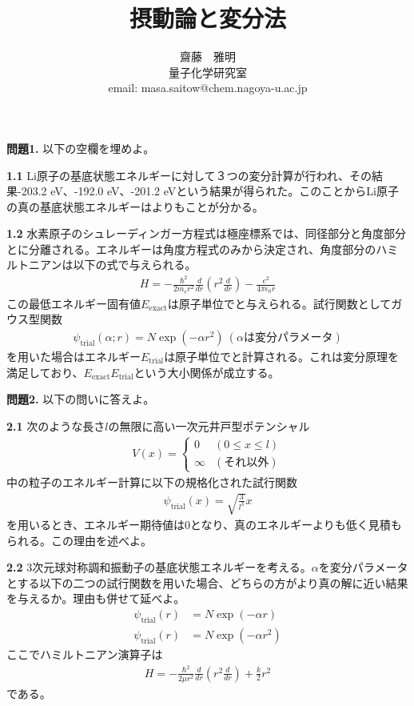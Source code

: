 \documentclass[11pt,pra,aps]{revtex4}
\newcommand{\boxz}[1]{\boxed{\phantom{\text{#1}}}}
\begin{document}
\title{摂動論と変分法}
\author{齋藤　雅明 \\ 量子化学研究室 \\ email: masa.saitow@chem.nagoya-u.ac.jp}

\maketitle

\noindent
{\bf 問題1.} 以下の空欄を埋めよ。

\noindent
{\bf 1.1} Li原子の基底状態エネルギーに対して３つの変分計算が行われ、その結果-203.2 eV、-192.0 eV、-201.2 eVという結果が得られた。このことからLi原子の真の基底状態エネルギーは\boxz{-203.2 eV}よりも\boxz{低い}ことが分かる。

\noindent
{\bf 1.2} 水素原子のシュレーディンガー方程式は極座標系では、同径部分と角度部分とに分離される。エネルギーは角度方程式のみから決定され、角度部分のハミルトニアンは以下の式で与えられる。
\begin{align}
  H = -\frac{\hbar^2}{2m_e r^2}\frac{d}{dr}\left(r^2\frac{d}{dr}\right)-\frac{e^2}{4\pi\epsilon_0 r}
\end{align}
この最低エネルギー固有値$E_\text{exact}$は原子単位で\boxz{-0.5}と与えられる。試行関数としてガウス型関数
\begin{align}
  \psi_\text{trial}(\alpha;r)=N\exp\left(-\alpha r^2\right) \ (\alpha\text{は変分パラメータ})
\end{align}
を用いた場合はエネルギー$E_\text{trial}$は原子単位で\boxz{-0.424}と計算される。これは変分原理を満足しており、$E_\text{exact}$\boxz{$\leq$}$E_\text{trial}$という大小関係が成立する。

\noindent
{\bf 問題2.} 以下の問いに答えよ。

\noindent
{\bf 2.1} 次のような長さ$l$の無限に高い一次元井戸型ポテンシャル
\begin{align}
  V(x)=\left\{
  \begin{array}{cc}
    0 & (0 \leq x \leq l) \\
    \infty & (\text{それ以外})
  \end{array}
  \right.
\end{align}
中の粒子のエネルギー計算に以下の規格化された試行関数
\begin{align}
  \psi_\text{trial}(x) = \sqrt{\frac{3}{l^3}}x
\end{align}
を用いるとき、エネルギー期待値は0となり、真のエネルギーよりも低く見積もられる。この理由を述べよ。

\noindent
{\bf 2.2} 3次元球対称調和振動子の基底状態エネルギーを考える。$\alpha$を変分パラメータとする以下の二つの試行関数を用いた場合、どちらの方がより真の解に近い結果を与えるか。理由も併せて延べよ。
\begin{align}
  \psi_\text{trial}(r)&=N\exp\left(-\alpha r\right) \\
  \psi_\text{trial}(r)&=N\exp\left(-\alpha r^2\right)
\end{align}
ここでハミルトニアン演算子は
\begin{align}
  H=-\frac{\hbar^2}{2\mu r^2}\frac{d}{dr}\left(r^2\frac{d}{dr}\right)+\frac{k}{2}r^2
\end{align}
である。
\end{document}
